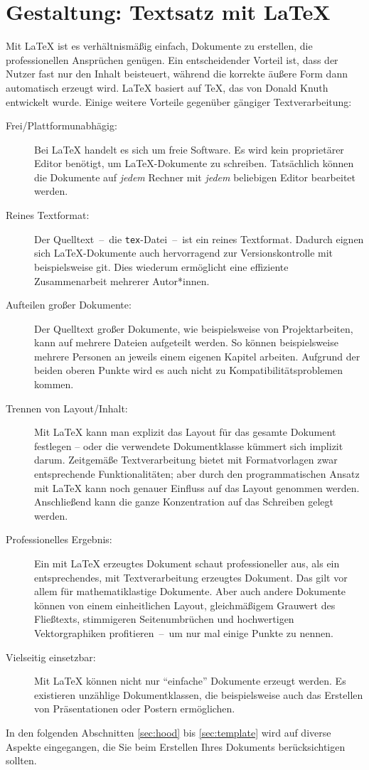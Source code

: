 \chapter{Gestaltung: Textsatz mit \LaTeX}
\label{chap:Textsatz}
%
Mit \LaTeX{} ist es verhältnismäßig einfach, Dokumente zu erstellen, die professionellen Ansprüchen genügen. Ein entscheidender Vorteil ist, dass der Nutzer fast nur den Inhalt beisteuert, während die korrekte äußere Form dann automatisch erzeugt wird. \LaTeX{} basiert auf \TeX{}, das von Donald Knuth entwickelt wurde. Einige weitere Vorteile gegenüber gängiger
Textverarbeitung:
\begin{description}
	\item[Frei/Plattformunabhägig:] Bei \LaTeX{} handelt es sich um freie 
	Software. Es wird kein proprietärer Editor benötigt, um \LaTeX{}-Dokumente
	zu schreiben. Tatsächlich können die Dokumente auf \emph{jedem} Rechner
	mit \emph{jedem} beliebigen Editor bearbeitet werden.
	\item[Reines Textformat:] Der Quelltext~--~die \texttt{tex}-Datei~--~ist
	ein reines Textformat. Dadurch eignen sich \LaTeX{}-Dokumente auch 
	hervorragend zur Versionskontrolle mit beispielsweise git. Dies wiederum
	ermöglicht eine effiziente Zusammenarbeit mehrerer Autor*innen.
	\item[Aufteilen großer Dokumente:] Der Quelltext großer Dokumente, wie 
	beispielsweise von Projektarbeiten, kann auf mehrere Dateien
	aufgeteilt werden. So können beispielsweise mehrere Personen an jeweils
	einem eigenen Kapitel arbeiten. Aufgrund der beiden oberen Punkte wird es 
	auch nicht zu Kompatibilitätsproblemen kommen.
	\item[Trennen von Layout/Inhalt:] Mit \LaTeX{} kann man explizit das
	Layout für das gesamte Dokument festlegen -- oder die verwendete 
	Dokumentklasse kümmert sich implizit darum. Zeitgemäße Textverarbeitung
	bietet mit Formatvorlagen zwar entsprechende Funktionalitäten; aber
	durch den programmatischen Ansatz mit \LaTeX{} kann noch genauer
	Einfluss auf das Layout genommen werden. Anschließend kann die ganze
	Konzentration auf das Schreiben gelegt werden.
	\item[Professionelles Ergebnis:] Ein mit \LaTeX{} erzeugtes Dokument
	schaut professioneller aus, als ein entsprechendes, mit Textverarbeitung
	erzeugtes Dokument. Das gilt vor allem für mathematiklastige Dokumente.
	Aber auch andere Dokumente können von einem einheitlichen 
	Layout, gleichmäßigem Grauwert des Fließtexts, stimmigeren Seitenumbrüchen 
	und hochwertigen Vektorgraphiken profitieren~--~um nur mal einige Punkte zu 
	nennen.
	\item[Vielseitig einsetzbar:] Mit \LaTeX{} können nicht nur 
	\enquote{einfache} Dokumente erzeugt werden. Es existieren unzählige
	Dokumentklassen, die beispielsweise auch das Erstellen von Präsentationen
	oder Postern ermöglichen.
\end{description}
\par
In den folgenden Abschnitten \ref{sec:hood} bis \ref{sec:template} wird auf diverse Aspekte eingegangen, die Sie beim Erstellen Ihres Dokuments berücksichtigen sollten.
%
%
